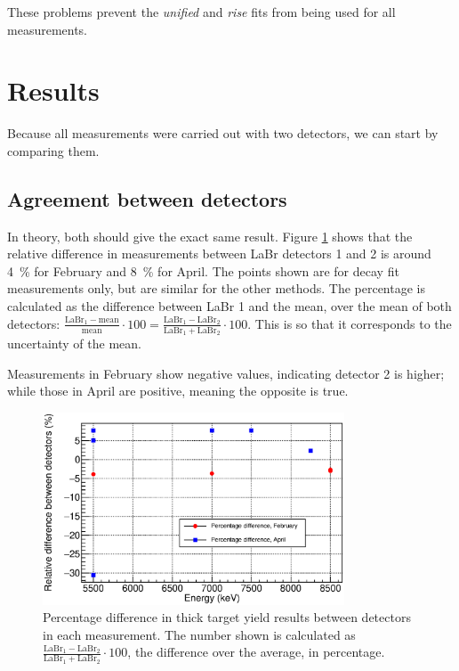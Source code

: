 \documentclass[a4paper,12pt]{report}
\begin{document}
These problems prevent the \textit{unified} and \textit{rise} fits from being used for all measurements.
\\

\section{Results}
Because all measurements were carried out with two detectors, we can start by comparing them.

\subsection{Agreement between detectors}
In theory, both should give the exact same result.
Figure \ref{decay_errors_rel_per} shows that the relative difference in measurements between LaBr detectors 1 and 2 is around \qty{4}{\percent} for February and \qty{8}{\percent} for April.
The points shown are for decay fit measurements only, but are similar for the other methods.
The percentage is calculated as the difference between LaBr 1 and the mean, over the mean of both detectors: $\frac{\text{LaBr}_1-\text{mean}}{\text{mean}}\cdot 100 = \frac{\text{LaBr}_1-\text{LaBr}_2}{\text{LaBr}_1+\text{LaBr}_2}\cdot 100$.
This is so that it corresponds to the uncertainty of the mean.

Measurements in February show negative values, indicating detector 2 is higher; while those in April are positive, meaning the opposite is true.

\begin{figure}[H]
	\centering
	\includegraphics[width=0.80\textwidth]{decay_errors_rel_per.eps}
	\caption{Percentage difference in thick target yield results between detectors in each measurement.
	The number shown is calculated as $\frac{\text{LaBr}_1-\text{LaBr}_2}{\text{LaBr}_1+\text{LaBr}_2}\cdot 100$, the difference over the average, in percentage.}
	\label{decay_errors_rel_per}
\end{figure}
\end{document}

